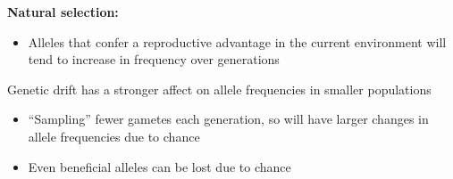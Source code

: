 \documentclass[14pt,table]{beamer}
\begin{document}
\begin{frame}
\begin{adjustwidth}{-1.5em}{-1.5em}
    \textbf{Natural selection:}
    \begin{itemize}
        \item Alleles that confer a reproductive advantage in the current
            environment will tend to increase in frequency over generations 
    \end{itemize}

    \vspace{5mm}

    \vspace{5mm}

    \vspace{5mm}
\end{adjustwidth}
\end{frame}

\begin{frame}
\begin{adjustwidth}{-1.5em}{-1.5em}
    Genetic drift has a stronger affect on allele frequencies in smaller
    populations
    \begin{itemize}
        \item ``Sampling'' fewer gametes each generation, so will have
            larger changes in allele frequencies due to chance
        \item Even beneficial alleles can be lost due to chance
    \end{itemize}

    \vspace{1cm}
\end{adjustwidth}
\end{frame}
\end{document}
